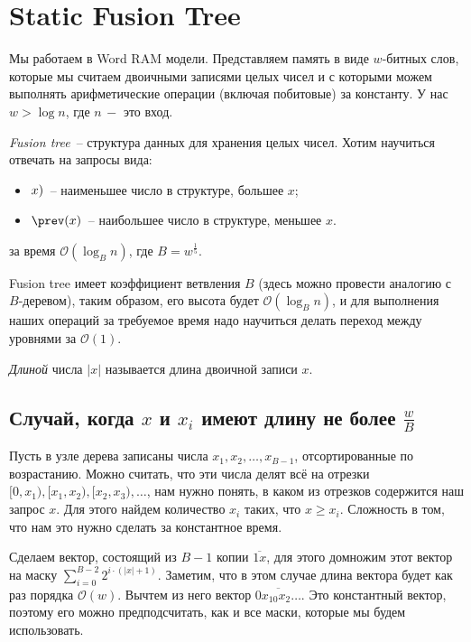 \section{Static Fusion Tree} 

Мы работаем в Word RAM модели. Представляем память в виде $w$-битных слов, которые мы считаем двоичными записями целых чисел и с которыми можем выполнять арифметические операции (включая побитовые) за константу. У нас $w > \log n$, где $n\, -$ это вход.

\emph{Fusion tree}~-- структура данных для хранения целых чисел.
Хотим научиться отвечать на запросы вида:
\begin{itemize}
    \item $\next(x)$~-- наименьшее число в структуре, большее $x$;
    \item $\prev(x)$~-- наибольшее число в структуре, меньшее $x$.
\end{itemize}
за время $\mathcal{O}(\log_B n)$, где $B = w^{\frac{1}{5}}$.

Fusion tree имеет коэффициент ветвления $B$ (здесь можно провести аналогию с $B$-деревом), таким образом, его высота будет $\mathcal{O}(\log_B n)$, и для выполнения наших операций за требуемое время надо научиться делать переход между уровнями за $\mathcal{O}(1)$.

\textit{Длиной} числа $|x|$ называется длина двоичной записи $x$.

\subsection{Случай, когда $x$ и $x_i$ имеют длину не более $\frac{w}{B}$}

Пусть в узле дерева записаны числа $x_1, x_2, \ldots, x_{B-1}$, отсортированные по возрастанию. Можно считать, что эти числа делят всё на отрезки $[0, x_1), [x_1, x_2), [x_2,x_3), \ldots$, нам нужно понять, в каком из отрезков содержится наш запрос $x$. Для этого найдем количество $x_i$ таких, что $x \geqslant x_i$. Сложность в том, что нам это нужно сделать за константное время.

Сделаем вектор, состоящий из $B-1$ копии $\overline{1x}$, для этого домножим этот вектор на маску $\sum_{i=0}^{B-2} 2^{i\cdot(|x|+1)}$. Заметим, что в этом случае длина вектора будет как раз порядка $\mathcal{O}(w)$.
Вычтем из него вектор $\overline{0x_10x_2\ldots}$. Это константный вектор, поэтому его можно предподсчитать, как и все маски, которые мы будем использовать.

